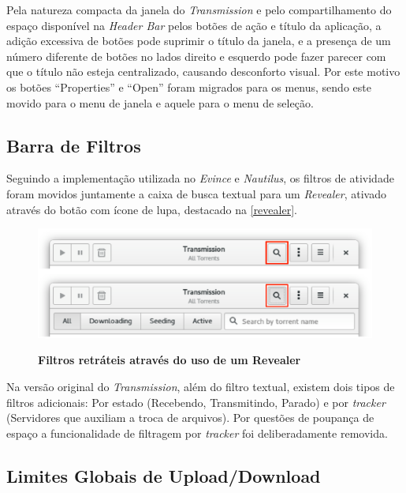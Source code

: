 Pela natureza compacta da janela do \textit{Transmission} e pelo
compartilhamento do espaço disponível na \textit{Header Bar} pelos botões de
ação e título da aplicação, a adição excessiva de botões pode suprimir o título
da janela, e a presença de um número diferente de botões no lados direito e
esquerdo pode fazer parecer com que o título não esteja centralizado, causando
desconforto visual. Por este motivo os botões ``Properties'' e ``Open'' foram
migrados para os menus, sendo este movido para o menu de janela e aquele para o
menu de seleção.

\subsection{Barra de Filtros}

Seguindo a implementação utilizada no \textit{Evince} e \textit{Nautilus}, os
filtros de atividade foram movidos juntamente a caixa de busca textual para um
\textit{Revealer}, ativado através do botão com ícone de lupa, destacado na
\autoref{revealer}.

\begin{figure}[!ht]
  \begin{center}
    \caption{\textbf{Filtros retráteis através do uso de um Revealer}}
    \includegraphics [width=\textwidth]{image/revealer.eps}
    \label{revealer}
  \end{center}
\end{figure}

Na versão original do \textit{Transmission}, além do filtro textual, existem
dois tipos de filtros adicionais: Por estado (Recebendo, Transmitindo, Parado) e
por \textit{tracker} (Servidores que auxiliam a troca de arquivos). Por questões
de poupança de espaço a funcionalidade de filtragem por \textit{tracker} foi
deliberadamente removida.

\subsection{Limites Globais de Upload/Download}


